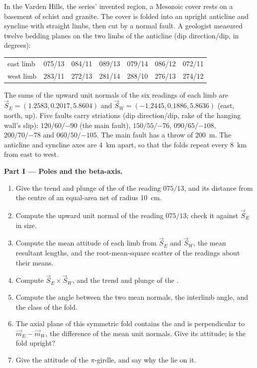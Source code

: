 \begin{problem}
\label{pb:b3:structural-analysis:1}
In the Varden Hills, the series' invented region, a Mesozoic cover rests on a
basement of schist and granite. The cover is folded into an upright
anticline and syncline with straight limbs, then cut by a normal fault. A
geologist measured twelve bedding planes on the two limbs of the anticline
(dip direction/dip, in degrees):

\begin{center}
\small
\begin{tabular}{l|cccccc}
\hline
east limb & 075/13 & 084/11 & 089/13 & 079/14 & 086/12 & 072/11 \\
west limb & 283/11 & 272/13 & 281/14 & 288/10 & 276/13 & 274/12 \\
\hline
\end{tabular}
\end{center}

The sums of the upward unit normals of the six readings of each limb are
$\vec S_E = (1.2583, 0.2017, 5.8604)$ and $\vec S_W = (-1.2445, 0.1886,
5.8636)$ (east, north, up). Five faults carry striations (dip direction/dip,
rake of the hanging wall's slip): $120/60/{-90}$ (the main fault), $150/55/{-76}$,
$090/65/{-108}$, $200/70/{-78}$ and $060/50/{-105}$. The main fault has a
throw of \qty{200}{m}. The anticline and syncline axes are \qty{4}{km} apart,
so that the folds repeat every \qty{8}{km} from east to west.

\medskip\noindent\textbf{Part I --- Poles and the beta-axis.}
\begin{enumerate}
  \item Give the trend and plunge of the  of the reading $075/13$, and
        its distance from the centre of an equal-area net of radius
        \qty{10}{cm}.
  \item Compute the upward unit normal of the reading $075/13$; check it
        against $\vec S_E$ in size.
  \item Compute the mean attitude of each limb from $\vec S_E$ and $\vec S_W$,
        the mean resultant lengths, and the root-mean-square scatter of the
        readings about their means.
  \item Compute $\vec S_E\times\vec S_W$, and the trend and plunge of the
        .
  \item Compute the angle between the two mean normals, the interlimb angle,
        and the class of the fold.
  \item The axial plane of this symmetric fold contains the  and is
        perpendicular to $\vec m_E - \vec m_W$, the difference of the mean unit
        normals. Give its attitude; is the fold upright?
  \item Give the attitude of the $\pi$-girdle, and say why the  lie on
        it.
\end{enumerate}


\end{problem}
